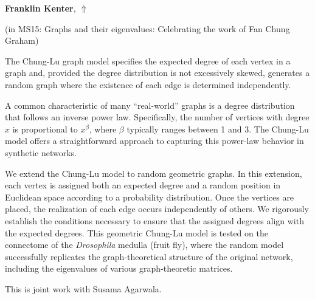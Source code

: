 \documentclass[ILAS2025-program.tex]{subfiles}
\begin{document}
     \hypertarget{down0138}{}\begin{ilasabstract}
    
    \textbf{Franklin Kenter},  \hfill \hyperlink{up0138}{$\Uparrow$}
    
    (in {\color{mstitle}MS15: Graphs and their eigenvalues: Celebrating the work of Fan Chung Graham})
        
        \mtskip
    The Chung-Lu graph model specifies the expected degree of each vertex in a graph and, provided the degree distribution is not excessively skewed, generates a random graph where the existence of each edge is determined independently.

A common characteristic of many ``real-world'' graphs is a degree distribution that follows an inverse power law. Specifically, the number of vertices with degree $x$ is proportional to $x^\beta$, where $\beta$ typically ranges between 1 and 3. The Chung-Lu model offers a straightforward approach to capturing this power-law behavior in synthetic networks.

We extend the Chung-Lu model to random geometric graphs. In this extension, each vertex is assigned both an expected degree and a random position in Euclidean space according to a probability distribution. Once the vertices are placed, the realization of each edge occurs independently of others. We rigorously establish the conditions necessary to ensure that the assigned degrees align with the expected degrees. This geometric Chung-Lu model is tested on the connectome of the \emph{Drosophila} medulla (fruit fly), where the random model successfully replicates the graph-theoretical structure of the original network, including the eigenvalues of various graph-theoretic matrices.

This is joint work with Susama Agarwala.
\end{ilasabstract}
\end{document}
